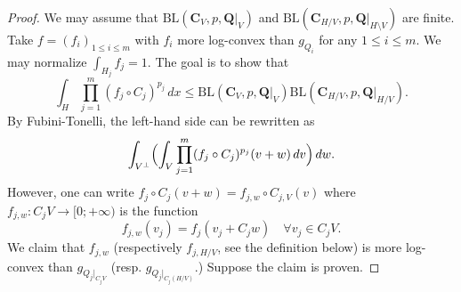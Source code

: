 \documentclass[11pt,a4paper,reqno]{amsart}
\numberwithin{equation}{section}
\theoremstyle{definition}
\newcommand{\<}{\ensuremath \leq}
\renewcommand{\>}{\ensuremath \geq}
\begin{document}
\begin{proof}
    We may assume that $\mathrm{BL}(\textbf{C}_V,p,\textbf{Q}|_V)$ and $\mathrm{BL}(\textbf{C}_{H/V},p,\textbf{Q}|_{H \setminus V})$ are finite. Take $f=(f_i)_{1 \leq i \leq m}$ with $f_i$ more log-convex than $g_{Q_i}$ for any $1 \leq i \leq m.$ We may normalize $\int_{H_j}f_j=1.$ The goal is to show that $$\int_H \prod_{j=1}^m (f_j \circ C_j)^{p_j}\, dx \leq \mathrm{BL}(\textbf{C}_V,p,\textbf{Q}|_V)\mathrm{BL}(\textbf{C}_{H/V},p,\textbf{Q}|_{H/V}).$$ By Fubini-Tonelli, the left-hand side can be rewritten as $$\int_{V^\perp}\Bigl (\int_V \prod_{j=1}^m (f_j \circ C_j)^{p_j}(v+w)\, dv \Bigl)\, dw.$$ However, one can write $f_j \circ C_j(v+w)=f_{j,w}\circ C_{j,V}(v)$ where $f_{j,w}: C_jV \rightarrow [0;+\infty)$ is the function $$f_{j,w}(v_j)=f_j(v_j+C_jw) \quad \forall v_j \in C_jV.$$ We claim that $f_{j,w}$ (respectively $f_{j,H/V}$, see the definition below) is more log-convex than $g_{Q_j|_{C_jV}}$ (resp. $g_{Q_j|_{C_j(H/V)}}.$) Suppose the claim is proven.
    

\end{proof}
\end{document}
